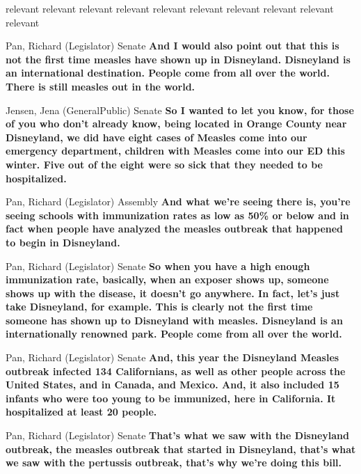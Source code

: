 relevant
relevant
relevant
relevant
relevant
relevant
relevant
relevant
relevant
relevant
\begin{result}{12.548020032233172}{Pan, Richard (Legislator) Senate}
\textbf{And I would also point out that this is not the first time measles have shown up in Disneyland. Disneyland is an international destination. People come from all over the world. There is still measles out in the world.
}\end{result}

\begin{result}{11.647790196985587}{Jensen, Jena (GeneralPublic) Senate}
\textbf{So I wanted to let you know, for those of you who don't already know, being located in Orange County near Disneyland, we did have eight cases of Measles come into our emergency department, children with Measles come into our ED this winter. Five out of the eight were so sick that they needed to be hospitalized.
}\end{result}

\begin{result}{10.309882024303807}{Pan, Richard (Legislator) Assembly}
\textbf{And what we're seeing there is, you're seeing schools with immunization rates as low as 50\% or below and in fact when people have analyzed the measles outbreak that happened to begin in Disneyland.
}\end{result}

\begin{result}{10.181845950621415}{Pan, Richard (Legislator) Senate}
\textbf{So when you have a high enough immunization rate, basically, when an exposer shows up, someone shows up with the disease, it doesn't go anywhere. In fact, let's just take Disneyland, for example. This is clearly not the first time someone has shown up to Disneyland with measles. Disneyland is an internationally renowned park. People come from all over the world.
}\end{result}

\begin{result}{9.883816091413054}{Pan, Richard (Legislator) Senate}
\textbf{And, this year the Disneyland Measles outbreak infected 134 Californians, as well as other people across the United States, and in Canada, and Mexico. And, it also included 15 infants who were too young to be immunized, here in California.  It hospitalized at least 20 people.
}\end{result}

\begin{result}{9.342610750665486}{Pan, Richard (Legislator) Senate}
\textbf{That's what we saw with the Disneyland outbreak, the measles outbreak that started in Disneyland, that's what we saw with the pertussis outbreak, that's why we're doing this bill.
}\end{result}

